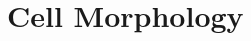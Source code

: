 \documentclass[10pt,a4paper]{article}
\begin{document}





\section{Cell Morphology}

\begin{landscape}
{\small{}}  
\end{landscape}

\end{document}
